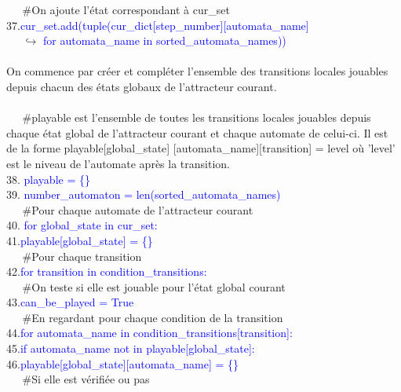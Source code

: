 \documentclass[12pt,a4paper]{article}
\begin{document}
{		\textcolor{white}{3ch}\qquad\#On ajoute l'état correspondant à cur\_set\\
		37.\qquad\textcolor{blue}{cur\_set.add(tuple(cur\_dict[step\_number][automata\_name]}\\
		\textcolor{white}{3ch}\qquad\qquad\qquad\qquad$\hookrightarrow$ \textcolor{blue}{for automata\_name in sorted\_automata\_names))}\\ \\
	On commence par créer et compléter l'ensemble des transitions locales jouables depuis chacun des états globaux de l'attracteur courant.\\ \\
	\textcolor{white}{3ch}\#playable est l'ensemble de toutes les transitions locales jouables depuis chaque état global de l'attracteur courant et chaque automate de celui-ci. Il est de la forme playable[global\_state]
	[automata\_name][transition] = level où 'level' est le niveau de l'automate après la transition.\\
	38. \textcolor{blue}{playable = \{\}}\\
	39. \textcolor{blue}{number\_automaton = len(sorted\_automata\_names)}\\
	\textcolor{white}{3ch}\#Pour chaque automate de l'attracteur courant\\
	40. \textcolor{blue}{for global\_state in cur\_set:}\\
		41.\qquad\textcolor{blue}{playable[global\_state] = \{\}}\\
		\textcolor{white}{3ch}\qquad\#Pour chaque transition\\
		42.\qquad\textcolor{blue}{for transition in condition\_transitions:}\\
			\textcolor{white}{3ch}\qquad\qquad\#On teste si elle est jouable pour l'état global courant\\
			43.\qquad\qquad\textcolor{blue}{can\_be\_played = True}\\
			\textcolor{white}{3ch}\qquad\qquad\#En regardant pour chaque condition de la transition\\
			44.\qquad\qquad\textcolor{blue}{for automata\_name in condition\_transitions[transition]:}\\
				45.\qquad\qquad\qquad\textcolor{blue}{if automata\_name not in playable[global\_state]:}\\
					46.\qquad\qquad\qquad\qquad\textcolor{blue}{playable[global\_state][automata\_name] = \{\}}\\
				\textcolor{white}{3ch}\qquad\qquad\qquad\#Si elle est vérifiée ou pas\\
}
\end{document}

